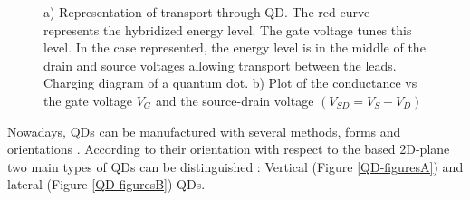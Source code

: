 \begin{figure}[t]
     \centering
    
     \caption{ a) Representation of transport through QD. The red curve represents the hybridized energy level. The gate voltage tunes this level. In the case represented, the energy level is in the middle of the drain and source voltages allowing transport between the leads.   Charging diagram of a quantum dot. b) Plot of the conductance vs the gate voltage $V_G$ and the source-drain voltage $(V_{SD}=V_{S}-V_{D} )$ \protect{}}
\end{figure}

  Nowadays, QDs can be manufactured with several methods, forms and orientations \citep{bimberg_quantum_1999}.
  According to their orientation with respect to the based 2D-plane  two main types of QDs can be distinguished : Vertical (Figure \ref{QD-figuresA}) and lateral (Figure \ref{QD-figuresB}) QDs. 


